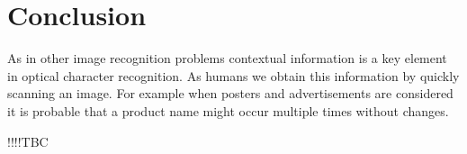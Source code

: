 \chapter{Conclusion}

As in other image recognition problems contextual information is a key element in optical character recognition. As humans we obtain this information by quickly scanning an image. For example when posters and advertisements are considered it is probable that a product name might occur multiple times without changes.

!!!!TBC